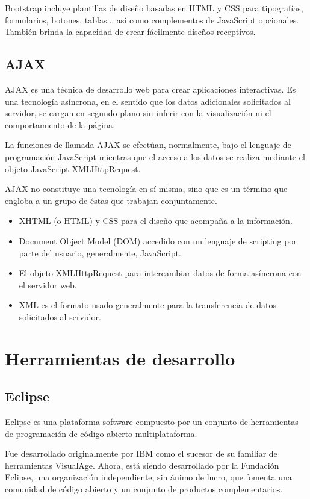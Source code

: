 Bootstrap incluye plantillas de diseño basadas en HTML y CSS para tipografías, formularios, botones, tablas... así como complementos de JavaScript opcionales. También brinda la capacidad de crear fácilmente diseños receptivos.

\subsection{AJAX}
AJAX es una técnica de desarrollo web para crear aplicaciones interactivas. Es una tecnología asíncrona, en el sentido que los datos adicionales solicitados al servidor, se cargan en segundo plano sin inferir con la visualización ni el comportamiento de la página.

La funciones de llamada AJAX se efectúan, normalmente, bajo el lenguaje de programación JavaScript mientras que el acceso a los datos se realiza mediante el objeto JavaScript XMLHttpRequest.

AJAX no constituye una tecnología en sí misma, sino que es un término que engloba a un grupo de éstas que trabajan conjuntamente.

	\begin{itemize}
		\item XHTML (o HTML) y CSS para el diseño que acompaña a la información.
		\item Document Object Model (DOM) accedido con un lenguaje de scripting por parte del usuario, generalmente, JavaScript.
		\item El objeto XMLHttpRequest para intercambiar datos de forma asíncrona con el servidor web.
		\item XML es el formato usado generalmente para la transferencia de datos solicitados al servidor.
	\end{itemize}
	

\section{Herramientas de desarrollo}
\subsection{Eclipse}
Eclipse es una plataforma software compuesto por un conjunto de herramientas de programación de código abierto multiplataforma.

Fue desarrollado originalmente por IBM como el sucesor de su familiar de herramientas VisualAge. Ahora, está siendo desarrollado por la Fundación Eclipse, una organización independiente, sin ánimo de lucro, que fomenta una comunidad de código abierto y un conjunto de productos complementarios.

